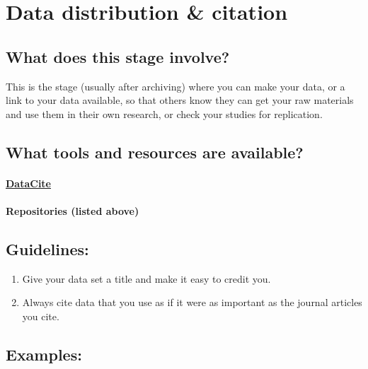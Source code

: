 \documentclass[]{article}
\begin{document}
\section{Data distribution \&
citation}\label{data-distribution-citation}

\subsection{What does this stage
involve?}\label{what-does-this-stage-involve-4}

This is the stage (usually after archiving) where you can make your
data, or a link to your data available, so that others know they can get
your raw materials and use them in their own research, or check your
studies for replication.

\subsection{What tools and resources are
available?}\label{what-tools-and-resources-are-available-4}

\paragraph{\href{https://www.datacite.org/}{DataCite}}\label{datacite}

\paragraph{Repositories (listed above)}\label{repositories-listed-above}

\subsection{Guidelines:}\label{guidelines-3}

\begin{enumerate}
\def\labelenumi{\arabic{enumi}.}
\itemsep1pt\parskip0pt
\item
  Give your data set a title and make it easy to credit you.
\item
  Always cite data that you use as if it were as important as the
  journal articles you cite.
\end{enumerate}

\subsection{Examples:}\label{examples-1}
\end{document}
